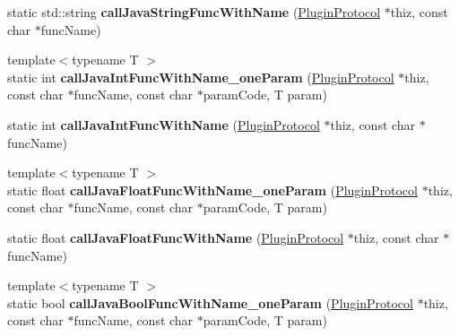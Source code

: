 \begin{DoxyCompactItemize}
\item 
\mbox{\label{classcocos2d_1_1plugin_1_1PluginUtils_aadb2d6468ee6204472e5da3e89cb0857}} 
static std\+::string {\bfseries call\+Java\+String\+Func\+With\+Name} (\hyperlink{classcocos2d_1_1plugin_1_1PluginProtocol}{Plugin\+Protocol} $\ast$thiz, const char $\ast$func\+Name)
\item 
\mbox{\label{classcocos2d_1_1plugin_1_1PluginUtils_afc997d80d6153df0259aac9d992f5b9b}} 
{\footnotesize template$<$typename T $>$ }\\static int {\bfseries call\+Java\+Int\+Func\+With\+Name\+\_\+one\+Param} (\hyperlink{classcocos2d_1_1plugin_1_1PluginProtocol}{Plugin\+Protocol} $\ast$thiz, const char $\ast$func\+Name, const char $\ast$param\+Code, T param)
\item 
\mbox{\label{classcocos2d_1_1plugin_1_1PluginUtils_ad1b0ea708890e9578bf340dd6c16fbe3}} 
static int {\bfseries call\+Java\+Int\+Func\+With\+Name} (\hyperlink{classcocos2d_1_1plugin_1_1PluginProtocol}{Plugin\+Protocol} $\ast$thiz, const char $\ast$func\+Name)
\item 
\mbox{\label{classcocos2d_1_1plugin_1_1PluginUtils_aaccd1c2a745b2bf536aaa247b1703212}} 
{\footnotesize template$<$typename T $>$ }\\static float {\bfseries call\+Java\+Float\+Func\+With\+Name\+\_\+one\+Param} (\hyperlink{classcocos2d_1_1plugin_1_1PluginProtocol}{Plugin\+Protocol} $\ast$thiz, const char $\ast$func\+Name, const char $\ast$param\+Code, T param)
\item 
\mbox{\label{classcocos2d_1_1plugin_1_1PluginUtils_a3ffd31a82e8c5e8d0b2355a6cbd7c325}} 
static float {\bfseries call\+Java\+Float\+Func\+With\+Name} (\hyperlink{classcocos2d_1_1plugin_1_1PluginProtocol}{Plugin\+Protocol} $\ast$thiz, const char $\ast$func\+Name)
\item 
\mbox{\label{classcocos2d_1_1plugin_1_1PluginUtils_a4adebaade5c392bc8b556c38e1620966}} 
{\footnotesize template$<$typename T $>$ }\\static bool {\bfseries call\+Java\+Bool\+Func\+With\+Name\+\_\+one\+Param} (\hyperlink{classcocos2d_1_1plugin_1_1PluginProtocol}{Plugin\+Protocol} $\ast$thiz, const char $\ast$func\+Name, const char $\ast$param\+Code, T param)

\end{DoxyCompactItemize}
